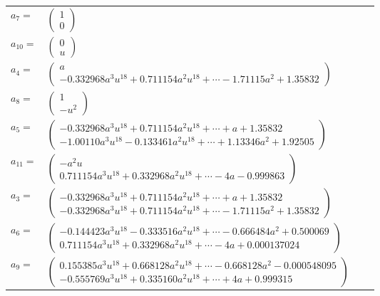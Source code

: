 \documentclass[1p]{elsarticle_modified}
\theoremstyle{definition}
\begin{document}
\begin{tabular}{m{7pt} m{180pt} m{7pt} m{180pt} }
\flushright $a_{7}=$&$\begin{pmatrix}1\\0\end{pmatrix}$ \\
\flushright $a_{10}=$&$\begin{pmatrix}0\\u\end{pmatrix}$ \\
\flushright $a_{4}=$&$\begin{pmatrix}a\\-0.332968 a^{3} u^{18}+0.711154 a^{2} u^{18}+\cdots-1.71115 a^{2}+1.35832\end{pmatrix}$ \\
\flushright $a_{8}=$&$\begin{pmatrix}1\\- u^2\end{pmatrix}$ \\
\flushright $a_{5}=$&$\begin{pmatrix}-0.332968 a^{3} u^{18}+0.711154 a^{2} u^{18}+\cdots+a+1.35832\\-1.00110 a^{3} u^{18}-0.133461 a^{2} u^{18}+\cdots+1.13346 a^{2}+1.92505\end{pmatrix}$ \\
\flushright $a_{11}=$&$\begin{pmatrix}- a^2 u\\0.711154 a^{3} u^{18}+0.332968 a^{2} u^{18}+\cdots-4 a-0.999863\end{pmatrix}$ \\
\flushright $a_{3}=$&$\begin{pmatrix}-0.332968 a^{3} u^{18}+0.711154 a^{2} u^{18}+\cdots+a+1.35832\\-0.332968 a^{3} u^{18}+0.711154 a^{2} u^{18}+\cdots-1.71115 a^{2}+1.35832\end{pmatrix}$ \\
\flushright $a_{6}=$&$\begin{pmatrix}-0.144423 a^{3} u^{18}-0.333516 a^{2} u^{18}+\cdots-0.666484 a^{2}+0.500069\\0.711154 a^{3} u^{18}+0.332968 a^{2} u^{18}+\cdots-4 a+0.000137024\end{pmatrix}$ \\
\flushright $a_{9}=$&$\begin{pmatrix}0.155385 a^{3} u^{18}+0.668128 a^{2} u^{18}+\cdots-0.668128 a^{2}-0.000548095\\-0.555769 a^{3} u^{18}+0.335160 a^{2} u^{18}+\cdots+4 a+0.999315\end{pmatrix}$ \\

\end{tabular}
\end{document}
